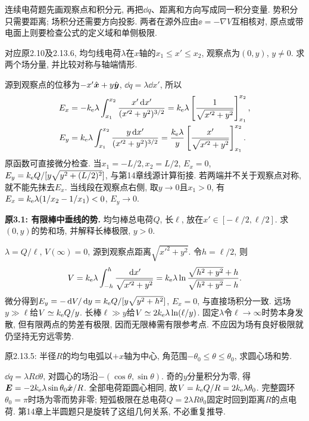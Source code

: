 \label{tb:finitesources}
连续电荷题先画观察点和积分元, 再把$\dd q$、距离和方向写成同一积分变量. 势积分只需要距离; 场积分还需要方向投影. 两者在源外应由$\ee=-\nabla V$互相核对, 原点或带电面上则要检查公式的定义域和单侧极限.

\begin{example}\label{ex:offaxisrod}
对应原2.10及2.13.6, 均匀线电荷$\lambda$在$x$轴的$x_1\le x'\le x_2$, 观察点为$(0,y)$, $y\ne0$. 求两个场分量, 并比较对称与轴端情形.
\end{example}
\begin{solution}
源到观察点的位移为$-x'\hat{\boldsymbol{x}}+y\hat{\boldsymbol{y}}$, $\dd q=\lambda\dd x'$, 所以
\begin{align*}
E_x&=-k_{\mathrm e}\lambda\int_{x_1}^{x_2}\frac{x'\,\mathrm d x'}{(x'^2+y^2)^{3/2}}
=k_{\mathrm e}\lambda\left[\frac1{\sqrt{x'^2+y^2}}\right]_{x_1}^{x_2},\\
E_y&=k_{\mathrm e}\lambda\int_{x_1}^{x_2}\frac{y\,\mathrm d x'}{(x'^2+y^2)^{3/2}}
=\frac{k_{\mathrm e}\lambda}{y}\left[\frac{x'}{\sqrt{x'^2+y^2}}\right]_{x_1}^{x_2}.
\end{align*}
原函数可直接微分检查. 当$x_1=-L/2,x_2=L/2$, $E_x=0$, $E_y=k_{\mathrm e} Q/[y\sqrt{y^2+(L/2)^2}]$, 与第14章线源计算衔接. 若两端并不关于观察点对称, 就不能先抹去$E_x$. 当线段在观察点右侧, 取$y\to0$且$x_1>0$, 有$E_x=k_{\mathrm e}\lambda(1/x_2-1/x_1)<0$, $E_y\to0$.
\end{solution}

\begin{example}
\textbf{原3.1: 有限棒中垂线的势.} 均匀棒总电荷$Q$, 长$\ell$, 放在$x'\in[-\ell/2,\ell/2]$. 求$(0,y)$的势和场, 并解释长棒极限, $y>0$.
\end{example}
\begin{solution}
$\lambda=Q/\ell$, $V(\infty)=0$, 源到观察点距离$\sqrt{x'^2+y^2}$. 令$h=\ell/2$, 则
\[V=k_{\mathrm e}\lambda\int_{-h}^{h}\frac{\,\mathrm d x'}{\sqrt{x'^2+y^2}}
=k_{\mathrm e}\lambda\ln\frac{\sqrt{h^2+y^2}+h}{\sqrt{h^2+y^2}-h}.\]
微分得到$E_y=-\,\mathrm d V/\,\mathrm d y=k_{\mathrm e} Q/[y\sqrt{y^2+h^2}]$, $E_x=0$, 与直接场积分一致. 远场$y\gg\ell$给$V\simeq k_{\mathrm e} Q/y$. 长棒$\ell\gg y$给$V\simeq2k_{\mathrm e}\lambda\ln(\ell/y)$. 固定$\lambda$令$\ell\to\infty$时势本身发散, 但有限两点的势差有极限, 因而无限棒需有限参考点. 不应因为场有良好极限就仍坚持无穷远零势.
\end{solution}

\begin{example}\label{ex:chargedarc}
原2.13.5: 半径$R$的均匀电弧以$+x$轴为中心, 角范围$-\theta_0\le\theta\le\theta_0$, 求圆心场和势.
\end{example}
\begin{solution}
$\dd q=\lambda R\dd\theta$, 对圆心的场沿$-(\cos\theta,\sin\theta)$. 奇的$y$分量积分为零, 得$\boldsymbol{E}=-2k_{\mathrm e}\lambda\sin\theta_0\hat{\boldsymbol{x}}/R$. 全部电荷距圆心相同, 故$V=k_{\mathrm e} Q/R=2k_{\mathrm e}\lambda\theta_0$. 完整圆环$\theta_0=\pi$时场为零而势非零; 短弧极限在总电荷$Q=2\lambda R\theta_0$固定时回到距离$R$的点电荷. 第14章上半圆题只是旋转了这组几何关系, 不必重复推导.
\end{solution}

